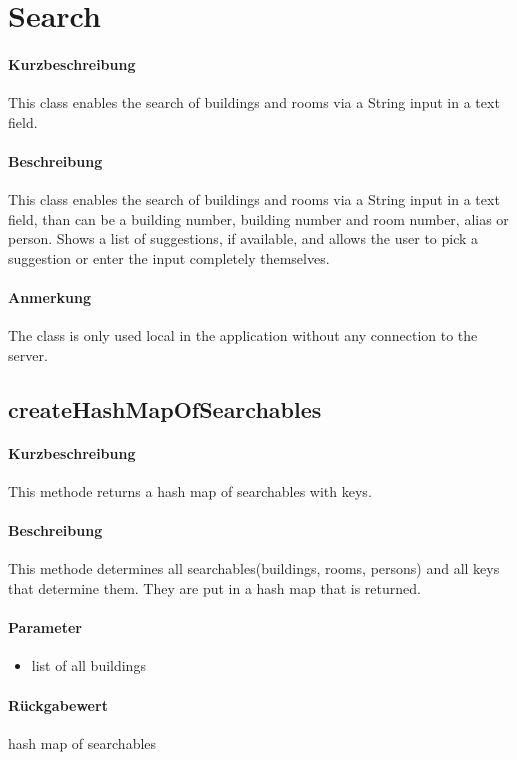 \section{Search}
\paragraph*{Kurzbeschreibung}
This class enables the search of buildings and rooms via a String input in a text field.
\paragraph*{Beschreibung}
This class enables the search of buildings and rooms via a String input in a text field, 
than can be a building number, building number and room number, alias or person.
Shows a list of suggestions, if available, and allows the user to pick a suggestion or enter the input completely themselves.
\paragraph*{Anmerkung}
The class is only used local in the application without any connection to the server.

\subsection{createHashMapOfSearchables}%
\paragraph*{Kurzbeschreibung}
This methode returns a hash map of searchables with keys.
\paragraph*{Beschreibung}
This methode determines all searchables(buildings, rooms, persons) and all keys that determine them. 
They are put in a hash map that is returned.
\paragraph*{Parameter}
\begin{itemize}
    \item list of all buildings
\end{itemize}
\paragraph*{Rückgabewert}
hash map of searchables

